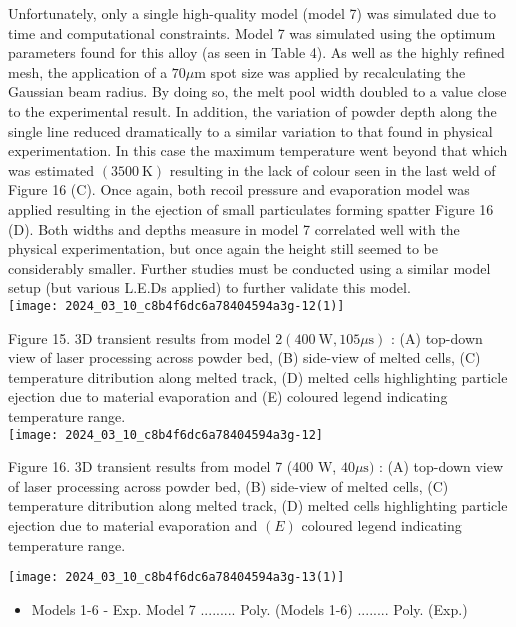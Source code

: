 \documentclass[10pt]{article}
\begin{document}
Unfortunately, only a single high-quality model (model 7) was simulated due to time and computational constraints. Model 7 was simulated using the optimum parameters found for this alloy (as seen in Table 4). As well as the highly refined mesh, the application of a $70 \mu \mathrm{m}$ spot size was applied by recalculating the Gaussian beam radius. By doing so, the melt pool width doubled to a value close to the experimental result. In addition, the variation of powder depth along the single line reduced dramatically to a similar variation to that found in physical experimentation. In this case the maximum temperature went beyond that which was estimated $(3500 \mathrm{~K})$ resulting in the lack of colour seen in the last weld of Figure 16 (C). Once again, both recoil pressure and evaporation model was applied resulting in the ejection of small particulates forming spatter Figure 16 (D). Both widths and depths measure in model 7 correlated well with the physical experimentation, but once again the height still seemed to be considerably smaller. Further studies must be conducted using a similar model setup (but various L.E.Ds applied) to further validate this model.\\
\texttt{[image: 2024\_03\_10\_c8b4f6dc6a78404594a3g-12(1)]}

Figure 15. 3D transient results from model $2(400 \mathrm{~W}, 105 \mu \mathrm{s})$ : (A) top-down view of laser processing across powder bed, (B) side-view of melted cells, (C) temperature ditribution along melted track, (D) melted cells highlighting particle ejection due to material evaporation and (E) coloured legend indicating temperature range.\\
\texttt{[image: 2024\_03\_10\_c8b4f6dc6a78404594a3g-12]}

Figure 16. 3D transient results from model 7 (400 W, $40 \mu \mathrm{s})$ : (A) top-down view of laser processing across powder bed, (B) side-view of melted cells, (C) temperature ditribution along melted track, (D) melted cells highlighting particle ejection due to material evaporation and $(E)$ coloured legend indicating temperature range.

\begin{center}
\texttt{[image: 2024\_03\_10\_c8b4f6dc6a78404594a3g-13(1)]}
\end{center}

\begin{itemize}
  \item Models 1-6 - Exp. Model 7 ......... Poly. (Models 1-6) ........ Poly. (Exp.)
\end{itemize}
\end{document}
